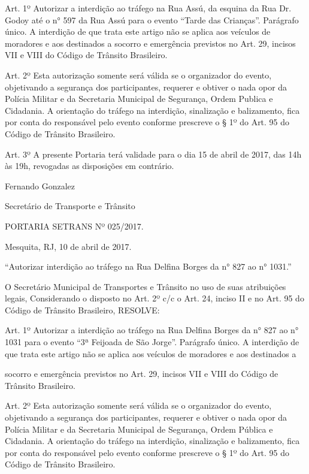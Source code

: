 \documentclass{doliberto}
\begin{document}
Art. 1º Autorizar a interdição ao tráfego na Rua Assú, da 
esquina da Rua Dr. Godoy até o n° 597 da Rua Assú para o 
evento “Tarde das Crianças”. 
Parágrafo único. A interdição de que trata este artigo não se 
aplica aos veículos de moradores e aos destinados a 
socorro e emergência previstos no Art. 29, incisos VII e VIII 
do Código de Trânsito Brasileiro.  
 
Art. 2º Esta autorização somente será válida se o 
organizador do evento, objetivando a segurança dos 
participantes, requerer e obtiver o nada opor da Polícia 
Militar e da Secretaria Municipal de Segurança, Ordem 
Publica e Cidadania.  A orientação do tráfego na 
interdição, sinalização e balizamento, fica por conta do 
responsável pelo evento conforme prescreve o § 1º do 
Art. 95 do Código de Trânsito Brasileiro.  
 
Art. 3º A presente Portaria terá validade para o dia 15 de 
abril de 2017, das 14h às 19h, revogadas as disposições em 
contrário. 
 

Fernando Gonzalez 

Secretário de Transporte e Trânsito 

 
PORTARIA SETRANS Nº 025/2017.                                  
                             
        Mesquita, 
RJ, 10 de abril de 2017. 
 
“Autorizar interdição ao tráfego na Rua Delfina Borges da 
n° 827 ao n° 1031.” 
 
 
O Secretário Municipal de Transportes e Trânsito no uso de 
suas atribuições legais,  
Considerando o disposto no Art. 2º c/c o Art. 24, inciso II e 
no Art. 95 do Código de Trânsito Brasileiro,  
RESOLVE:  
 
Art. 1º Autorizar a interdição ao tráfego na Rua Delfina 
Borges da n° 827 ao n° 1031 para o evento “3ª Feijoada de 
São Jorge”. 
Parágrafo único. A interdição de que trata este artigo não se 
aplica aos veículos de moradores e aos destinados a 

socorro e emergência previstos no Art. 29, incisos VII e VIII 
do Código de Trânsito Brasileiro.  
 
Art. 2º Esta autorização somente será válida se o 
organizador do evento, objetivando a segurança dos 
participantes, requerer e obtiver o nada opor da Polícia 
Militar e da Secretaria Municipal de Segurança, Ordem 
Pública e Cidadania.  A orientação do tráfego na 
interdição, sinalização e balizamento, fica por conta do 
responsável pelo evento conforme prescreve o § 1º do 
Art. 95 do Código de Trânsito Brasileiro.  
 
\end{document}
